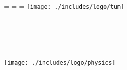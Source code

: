 \begin{titlepage}
\oddsidemargin=\evensidemargin\relax
\textwidth=\dimexpr{}\evensidemargin-2in\relax
\hsize=\textwidth\relax
\centering
\vspace{40mm}
\texttt{[image: ./includes/logo/tum]} \\
\vspace{5mm}
{\huge\MakeUppercase{\getFaculty{}}} \\
\vspace{5mm}
{\large\MakeUppercase{\getUniversity{}}} \\
\vspace{20mm}
{\Large \getDoctype{}} \\
\vspace{15mm}
{\huge\bfseries \getTitle{}} \\
\vspace{15mm}
{\LARGE \getAuthor{}} \\
\vspace{20mm}
\texttt{[image: ./includes/logo/physics]}
\end{titlepage}